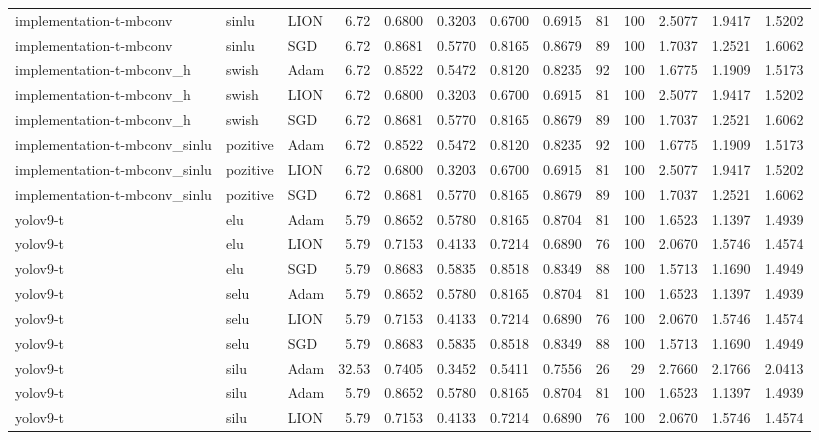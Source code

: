 \begin{table}[htbp]
{\begin{tabular}{lllrrrrrrrrrr}
implementation-t-mbconv & sinlu & LION & 6.72 & 0.6800 & 0.3203 & 0.6700 & 0.6915 & 81 & 100 & 2.5077 & 1.9417 & 1.5202 \\
implementation-t-mbconv & sinlu & SGD & 6.72 & 0.8681 & 0.5770 & 0.8165 & 0.8679 & 89 & 100 & 1.7037 & 1.2521 & 1.6062 \\
implementation-t-mbconv_h & swish & Adam & 6.72 & 0.8522 & 0.5472 & 0.8120 & 0.8235 & 92 & 100 & 1.6775 & 1.1909 & 1.5173 \\
implementation-t-mbconv_h & swish & LION & 6.72 & 0.6800 & 0.3203 & 0.6700 & 0.6915 & 81 & 100 & 2.5077 & 1.9417 & 1.5202 \\
implementation-t-mbconv_h & swish & SGD & 6.72 & 0.8681 & 0.5770 & 0.8165 & 0.8679 & 89 & 100 & 1.7037 & 1.2521 & 1.6062 \\
implementation-t-mbconv_sinlu & pozitive & Adam & 6.72 & 0.8522 & 0.5472 & 0.8120 & 0.8235 & 92 & 100 & 1.6775 & 1.1909 & 1.5173 \\
implementation-t-mbconv_sinlu & pozitive & LION & 6.72 & 0.6800 & 0.3203 & 0.6700 & 0.6915 & 81 & 100 & 2.5077 & 1.9417 & 1.5202 \\
implementation-t-mbconv_sinlu & pozitive & SGD & 6.72 & 0.8681 & 0.5770 & 0.8165 & 0.8679 & 89 & 100 & 1.7037 & 1.2521 & 1.6062 \\
yolov9-t & elu & Adam & 5.79 & 0.8652 & 0.5780 & 0.8165 & 0.8704 & 81 & 100 & 1.6523 & 1.1397 & 1.4939 \\
yolov9-t & elu & LION & 5.79 & 0.7153 & 0.4133 & 0.7214 & 0.6890 & 76 & 100 & 2.0670 & 1.5746 & 1.4574 \\
yolov9-t & elu & SGD & 5.79 & 0.8683 & 0.5835 & 0.8518 & 0.8349 & 88 & 100 & 1.5713 & 1.1690 & 1.4949 \\
yolov9-t & selu & Adam & 5.79 & 0.8652 & 0.5780 & 0.8165 & 0.8704 & 81 & 100 & 1.6523 & 1.1397 & 1.4939 \\
yolov9-t & selu & LION & 5.79 & 0.7153 & 0.4133 & 0.7214 & 0.6890 & 76 & 100 & 2.0670 & 1.5746 & 1.4574 \\
yolov9-t & selu & SGD & 5.79 & 0.8683 & 0.5835 & 0.8518 & 0.8349 & 88 & 100 & 1.5713 & 1.1690 & 1.4949 \\
yolov9-t & silu & Adam & 32.53 & 0.7405 & 0.3452 & 0.5411 & 0.7556 & 26 & 29 & 2.7660 & 2.1766 & 2.0413 \\
yolov9-t & silu & Adam & 5.79 & 0.8652 & 0.5780 & 0.8165 & 0.8704 & 81 & 100 & 1.6523 & 1.1397 & 1.4939 \\
yolov9-t & silu & LION & 5.79 & 0.7153 & 0.4133 & 0.7214 & 0.6890 & 76 & 100 & 2.0670 & 1.5746 & 1.4574 \\

\end{tabular}}
\end{table}
